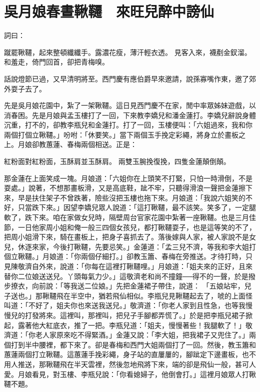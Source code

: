 %

\chapter{吳月娘春晝鞦韆　來旺兒醉中謗仙}

詞曰：

蹴罷鞦韆，起來整頓纖纖手。露濃花瘦，薄汗輕衣透。
見客入來，襪剷金釵溜。和羞走，倚門回首，卻把青梅嗅。

話說燈節已過，又早清明將至。西門慶有應伯爵早來邀請，說孫寡嘴作東，邀了郊外耍子去了。

先是吳月娘花園中，紮了一架鞦韆。這日見西門慶不在家，閒中率眾姊妹遊戲，以消春困。先是月娘與孟玉樓打了一回，下來教李嬌兒和潘金蓮打。李嬌兒辭說身體沉重，打不的，卻教李瓶兒和金蓮打。打了一回，玉樓便叫：「六姐過來，我和你兩個打個立鞦韆。」吩咐：「休要笑。」當下兩個玉手挽定彩繩，將身立於畫板之上。月娘卻教蕙蓮、春梅兩個相送。正是：

紅粉面對紅粉面，玉酥肩並玉酥肩。
兩雙玉腕挽復挽，四隻金蓮顛倒顛。

那金蓮在上面笑成一塊。月娘道：「六姐你在上頭笑不打緊，只怕一時滑倒，不是耍處。」說著，不想那畫板滑，又是高底鞋，跐不牢，只聽得滑浪一聲把金蓮擦下來，早是扶住架子不曾跌著，險些沒把玉樓也拖下來。月娘道：「我說六姐笑的不好，只當跌下來。」因望李嬌兒眾人說道：「這打鞦韆，最不該笑。笑多了，一定腿軟了，跌下來。咱在家做女兒時，隔壁周台官家花園中紮著一座鞦韆。也是三月佳節，一日他家周小姐和俺一般三四個女孩兒，都打鞦韆耍子，也是這等笑的不了，把周小姐滑下來，騎在畫板上，把身子喜抓去了。落後嫁與人家，被人家說不是女兒，休逐來家，今後打鞦韆，先要忌笑。」金蓮道：「孟三兒不濟，等我和李大姐打個立鞦韆。」月娘道：「你兩個仔細打。」卻教玉簫、春梅在旁推送。才待打時，只見陳敬濟自外來，說道：「你每在這裡打鞦韆哩。」月娘道：「姐夫來的正好，且來替你二位娘送送兒。丫頭每氣力少。」這敬濟老和尚不撞鐘──得不的一聲，於是撥步撩衣，向前說：「等我送二位娘。」先把金蓮裙子帶住，說道： 「五娘站牢，兒子送也。」那鞦韆飛在半空中，猶若飛仙相似。李瓶兒見鞦韆起去了，唬的上面怪叫道：「不好了，姐夫你也來送我送兒。」敬濟道：「你老人家到且性急，也等我慢慢兒的打發將來。這裡叫，那裡叫，把兒子手腳都弄慌了。」於是把李瓶兒裙子掀起，露著他大紅底衣，推了一把。李瓶兒道：「姐夫，慢慢著些！我腿軟了！」敬濟道：「你老人家原來吃不得緊酒。」金蓮又說：「李大姐，把我裙子又兜住了。」兩個打到半中腰裡，都下來了。卻是春梅和西門大姐兩個打了一回。然後，教玉簫和蕙蓮兩個打立鞦韆。這蕙蓮手挽彩繩，身子站的直屢屢的，腳跐定下邊畫板，也不用人推送，那鞦韆飛在半天雲裡，然後忽地飛將下來，端的卻是飛仙一般，甚可人愛。月娘看見，對玉樓、李瓶兒說：「你看媳婦子，他倒會打。」這裡月娘眾人打鞦韆不題。

